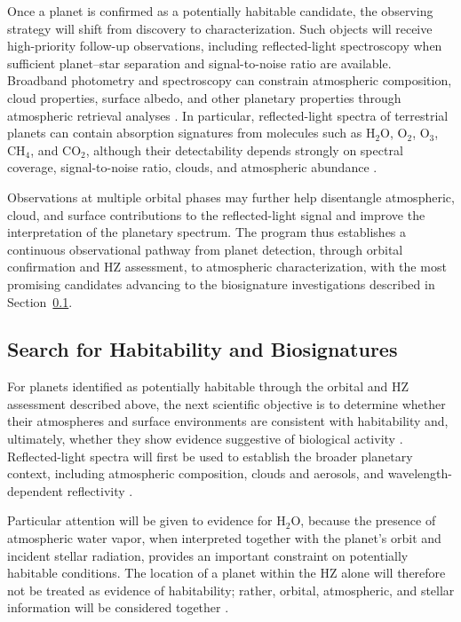 Once a planet is confirmed as a potentially habitable candidate, the observing
strategy will shift from discovery to characterization. Such objects will receive
high-priority follow-up observations, including reflected-light spectroscopy when
sufficient planet--star separation and signal-to-noise ratio are available.
Broadband photometry and spectroscopy can constrain atmospheric composition,
cloud properties, surface albedo, and other planetary properties through atmospheric
retrieval analyses \cite{Feng2018,KawashimaRugheimer2019}. In particular,
reflected-light spectra of terrestrial planets can contain absorption signatures
from molecules such as H$_2$O, O$_2$, O$_3$, CH$_4$, and CO$_2$, although their
detectability depends strongly on spectral coverage, signal-to-noise ratio, clouds,
and atmospheric abundance \cite{KawashimaRugheimer2019}.

Observations at multiple orbital phases may further help disentangle atmospheric,
cloud, and surface contributions to the reflected-light signal and improve the
interpretation of the planetary spectrum. The program thus establishes a continuous
observational pathway from planet detection, through orbital confirmation and HZ
assessment, to atmospheric characterization, with the most promising candidates
advancing to the biosignature investigations described in Section~\ref{sec:Habitab_Biosig}.

\subsection{Search for Habitability and Biosignatures}
\label{sec:Habitab_Biosig}

For planets identified as potentially habitable through the orbital and HZ
assessment described above, the next scientific objective is to determine whether
their atmospheres and surface environments are consistent with habitability and,
ultimately, whether they show evidence suggestive of biological activity
\cite{Schwieterman2018,Catling2018}. Reflected-light spectra will first be used
to establish the broader planetary context, including atmospheric composition,
clouds and aerosols, and wavelength-dependent reflectivity
\cite{Schwieterman2018}.

Particular attention will be given to evidence for H$_2$O, because the presence
of atmospheric water vapor, when interpreted together with the planet's orbit
and incident stellar radiation, provides an important constraint on potentially
habitable conditions. The location of a planet within the HZ alone will therefore
not be treated as evidence of habitability; rather, orbital, atmospheric, and
stellar information will be considered together
\cite{Schwieterman2018,Catling2018}.

